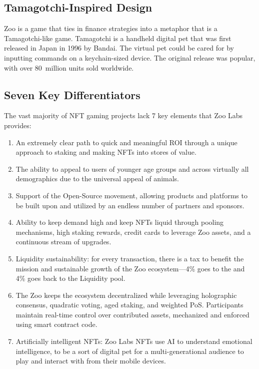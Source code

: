 \subsection{Tamagotchi-Inspired Design}

Zoo is a game that ties in finance strategies into a metaphor that is a Tamagotchi-like game. Tamagotchi is a handheld digital pet that was first released in Japan in 1996 by Bandai. The virtual pet could be cared for by inputting commands on a keychain-sized device. The original release was popular, with over 80~million units sold worldwide.

\subsection{Seven Key Differentiators}

The vast majority of NFT gaming projects lack 7 key elements that Zoo Labs provides:

\begin{enumerate}[nosep]
\item An extremely clear path to quick and meaningful ROI through a unique approach to staking and making NFTs into stores of value.
\item The ability to appeal to users of younger age groups and across virtually all demographics due to the universal appeal of animals.
\item Support of the Open-Source movement, allowing products and platforms to be built upon and utilized by an endless number of partners and sponsors.
\item Ability to keep demand high and keep NFTs liquid through pooling mechanisms, high staking rewards, credit cards to leverage Zoo assets, and a continuous stream of upgrades.
\item Liquidity sustainability: for every transaction, there is a tax to benefit the mission and sustainable growth of the Zoo ecosystem---4\% goes to the \DAO{} and 4\% goes back to the Liquidity pool.
\item The Zoo \DAO{} keeps the ecosystem decentralized while leveraging holographic consensus, quadratic voting, aged staking, and weighted PoS. Participants maintain real-time control over contributed assets, mechanized and enforced using smart contract code.
\item Artificially intelligent NFTs: Zoo Labs NFTs use AI to understand emotional intelligence, to be a sort of digital pet for a multi-generational audience to play and interact with from their mobile devices.
\end{enumerate}

